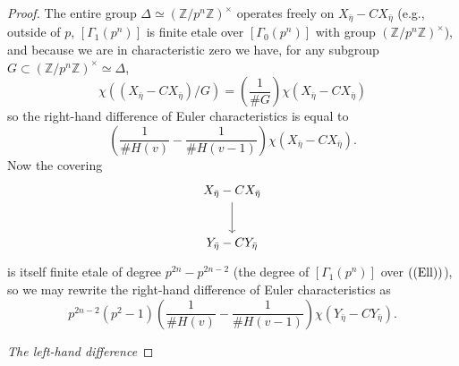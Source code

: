 \begin{proof}
The entire group $\Delta \simeq (\mathbb{Z}/p^n\mathbb{Z})^\times$ operates freely on $X_{\bar{\eta}} - CX_{\bar{\eta}}$ (e.g., outside of $p$, $[\Gamma_1(p^n)]$ is finite etale over $[\Gamma_0(p^n)]$ with group $(\mathbb{Z}/p^n\mathbb{Z})^\times$), and because we are in characteristic zero we have, for any subgroup $G \subset (\mathbb{Z}/p^n\mathbb{Z})^\times \simeq \Delta$,
\begin{equation}\label{eq:14.5.9.1}
\chi((X_{\bar{\eta}} - CX_{\bar{\eta}})/G) = \left( \frac{1}{\# G} \right) \chi(X_{\bar{\eta}} - CX_{\bar{\eta}})
\end{equation}
so the right-hand difference of Euler characteristics is equal to
\begin{equation}\label{eq:14.5.9.2}
\left( \frac{1}{\# H(v)} - \frac{1}{\# H(v-1)} \right) \chi(X_{\bar{\eta}} - CX_{\bar{\eta}}) .
\end{equation}
Now the covering
\begin{equation}\label{eq:14.5.9.3}
\begin{tikzcd}[row sep=2.5em]
X_{\bar{\eta}} - CX_{\bar{\eta}} \arrow[d] \\
Y_{\bar{\eta}} - CY_{\bar{\eta}}
\end{tikzcd}
\end{equation}
is itself finite etale of degree $p^{2n} - p^{2n-2}$ (the degree of $[\Gamma_1(p^n)]$ over $((\mathrm{Ell}))$), so we may rewrite the right-hand difference of Euler characteristics as
\begin{equation}\label{eq:14.5.9.4}
p^{2n-2}(p^2-1) \left( \frac{1}{\# H(v)} - \frac{1}{\# H(v-1)} \right) \chi(Y_{\bar{\eta}} - CY_{\bar{\eta}}) .
\end{equation}

\kmitem\label{item:14.5.10} \emph{The left-hand difference}


\end{proof}

